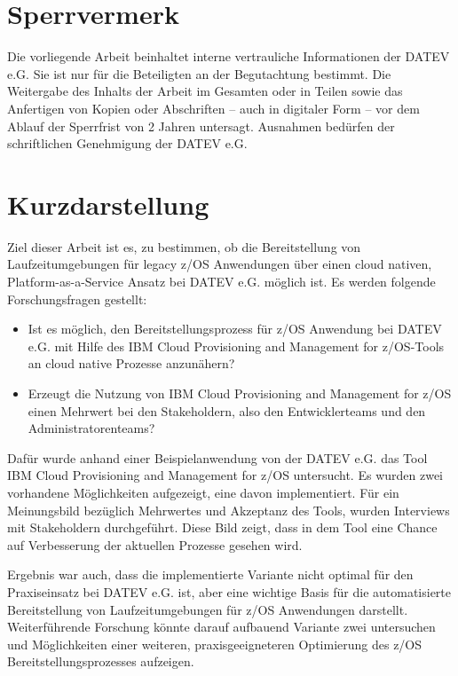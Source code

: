 \thispagestyle{empty}
\section*{Sperrvermerk}
Die vorliegende Arbeit beinhaltet interne vertrauliche Informationen der DATEV e.G.
Sie ist nur für die Beteiligten an der Begutachtung bestimmt.
Die Weitergabe des Inhalts der Arbeit im Gesamten oder in Teilen sowie das Anfertigen von Kopien oder Abschriften – auch in digitaler Form – vor dem Ablauf der Sperrfrist von 2 Jahren untersagt.
Ausnahmen bedürfen der schriftlichen Genehmigung der DATEV e.G.

\newpage
\section*{Kurzdarstellung}
\label{sec:kurzdarstellung}
Ziel dieser Arbeit ist es, zu bestimmen, ob die Bereitstellung von Laufzeitumgebungen für legacy z/OS Anwendungen über einen cloud nativen, Platform-as-a-Service Ansatz bei DATEV e.G. möglich ist.
Es werden folgende Forschungsfragen gestellt:
\begin{itemize}
\item Ist es möglich, den Bereitstellungsprozess für z/OS Anwendung bei DATEV e.G. mit Hilfe des \glqq IBM Cloud Provisioning and Management for z/OS\grqq-Tools an cloud native Prozesse anzunähern?
\item Erzeugt die Nutzung von \glqq IBM Cloud Provisioning and Management for z/OS\grqq{} einen Mehrwert bei den Stakeholdern, also den Entwicklerteams und den Administratorenteams?
\end{itemize}

Dafür wurde anhand einer Beispielanwendung von der DATEV e.G. das Tool \glqq IBM Cloud Provisioning and Management for z/OS\grqq{} untersucht.
Es wurden zwei vorhandene Möglichkeiten aufgezeigt, eine davon implementiert.
Für ein Meinungsbild bezüglich  Mehrwertes und Akzeptanz des Tools, wurden Interviews mit Stakeholdern durchgeführt.
Diese Bild zeigt, dass in dem Tool eine Chance auf Verbesserung der aktuellen Prozesse gesehen wird.

Ergebnis war auch, dass die implementierte Variante nicht optimal für den Praxiseinsatz bei DATEV e.G. ist, aber eine wichtige Basis für die automatisierte Bereitstellung von Laufzeitumgebungen für z/OS Anwendungen darstellt.
Weiterführende Forschung könnte darauf aufbauend Variante zwei untersuchen und  Möglichkeiten einer weiteren, praxisgeeigneteren Optimierung des z/OS Bereitstellungsprozesses aufzeigen.

